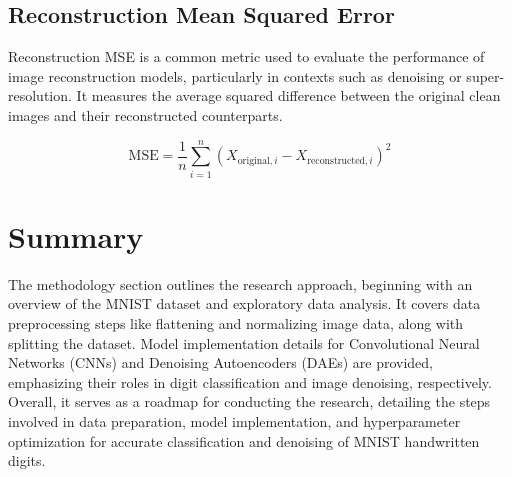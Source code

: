 \subsection{Reconstruction Mean Squared Error}
Reconstruction MSE is a common metric used to evaluate the performance of image reconstruction models, particularly in contexts such as denoising or super-resolution. It measures the average squared difference between the original clean images and their reconstructed counterparts.

\[
\text{MSE} = \frac{1}{n} \sum_{i=1}^{n} (X_{\text{original}, i} - X_{\text{reconstructed}, i})^2
\]


\section{Summary}
The methodology section outlines the research approach, beginning with an overview of the MNIST dataset and exploratory data analysis. It covers data preprocessing steps like flattening and normalizing image data, along with splitting the dataset. Model implementation details for Convolutional Neural Networks (CNNs) and Denoising Autoencoders (DAEs) are provided, emphasizing their roles in digit classification and image denoising, respectively. Overall, it serves as a roadmap for conducting the research, detailing the steps involved in data preparation, model implementation, and hyperparameter optimization for accurate classification and denoising of MNIST handwritten digits.
